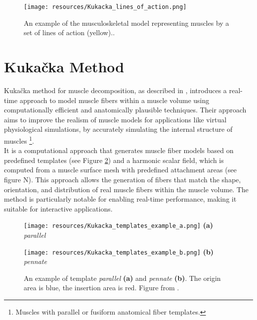 \documentclass[english, bc, kiv, he, iso690alph, pdf, viewonly]{fasthesis}
\begin{document}
\begin{figure}[h!]
	\centering
	\begin{minipage}[b]{0.8\textwidth}
		\centering
		\texttt{[image: resources/Kukacka\_lines\_of\_action.png]}
    \end{minipage}
	\caption{An example of the musculoskeletal model representing muscles by a set of lines of action (yellow).\cite{KK14}.}
	\label{fig:Kukacka_lines_of_action}
\end{figure}

\newpage

\section{Kukačka Method}

Kukačka method for muscle decomposition, as described in \cite{KK14}, introduces a real-time approach to model muscle fibers within a muscle volume using computationally efficient and anatomically plausible techniques. Their approach aims to improve the realism of muscle models for applications like virtual physiological simulations, by accurately simulating the internal structure of muscles \footnote{Muscles with parallel or fusiform anatomical fiber templates.}.\\

It is a computational approach that generates muscle fiber models based on predefined templates (see Figure \ref{fig:Kukacka_templates_example}) and a harmonic scalar field, which is computed from a muscle surface mesh with predefined attachment areas (see figure N). This approach allows the generation of fibers that match the shape, orientation, and distribution of real muscle fibers within the muscle volume. The method is particularly notable for enabling real-time performance, making it suitable for interactive applications. \\

\begin{figure}[h!]
	\centering
	\begin{minipage}[b]{0.4\textwidth}
		\centering
		\texttt{[image: resources/Kukacka\_templates\_example\_a.png]}
		\textbf{(a)} \textit{parallel}
    \end{minipage}
	\hspace{0.02\textwidth}
	\begin{minipage}[b]{0.4\textwidth}
		\centering
		\texttt{[image: resources/Kukacka\_templates\_example\_b.png]}
		\textbf{(b)} \textit{pennate}
    \end{minipage}

	\caption{An example of template \textit{parallel} \textbf{(a)} and \textit{pennate} \textbf{(b)}. The origin area is blue, the insertion area is red. Figure from \cite{KK14}.}
	\label{fig:Kukacka_templates_example}
\end{figure}
\end{document}
